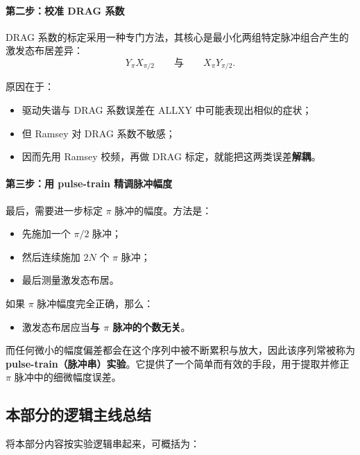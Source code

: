 \documentclass[12pt,a4paper,oneside]{ctexbook}
\begin{document}
\paragraph{第二步：校准 DRAG 系数}
DRAG 系数的标定采用一种专门方法，其核心是最小化两组特定脉冲组合产生的激发态布居差异：
\[
Y_{\pi}X_{\pi/2}
\qquad \text{与} \qquad
X_{\pi}Y_{\pi/2}.
\]

原因在于：
\begin{itemize}
    \item 驱动失谐与 DRAG 系数误差在 ALLXY 中可能表现出相似的症状；
    \item 但 Ramsey 对 DRAG 系数不敏感；
    \item 因而先用 Ramsey 校频，再做 DRAG 标定，就能把这两类误差\textbf{解耦}。
\end{itemize}

\paragraph{第三步：用 pulse-train 精调脉冲幅度}
最后，需要进一步标定 \(\pi\) 脉冲的幅度。方法是：
\begin{itemize}
    \item 先施加一个 \(\pi/2\) 脉冲；
    \item 然后连续施加 \(2N\) 个 \(\pi\) 脉冲；
    \item 最后测量激发态布居。
\end{itemize}

如果 \(\pi\) 脉冲幅度完全正确，那么：
\begin{itemize}
    \item 激发态布居应当\textbf{与 \(\pi\) 脉冲的个数无关}。
\end{itemize}

而任何微小的幅度偏差都会在这个序列中被不断累积与放大，因此该序列常被称为\textbf{pulse-train（脉冲串）实验}。它提供了一个简单而有效的手段，用于提取并修正 \(\pi\) 脉冲中的细微幅度误差。

\subsection{本部分的逻辑主线总结}

将本部分内容按实验逻辑串起来，可概括为：
\end{document}
